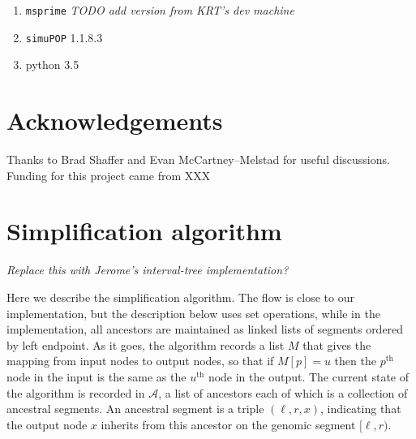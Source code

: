 \documentclass{article}
\newcommand{\simupop}{\texttt{simuPOP}}
\newcommand{\msprime}{\texttt{msprime}}
\newcommand{\Al}{\mathcal{A}}  %
\newcommand{\plr}[1]{{\em \color{blue} #1}}
\newcommand{\jda}[1]{{\em \color{cyan} #1}}
\begin{document}
\begin{enumerate}
    \item \msprime{} \jda{TODO add version from KRT's dev machine}
    \item \simupop{} 1.1.8.3
    \item python 3.5
\end{enumerate}

\section*{Acknowledgements}
Thanks to Brad Shaffer and Evan McCartney--Melstad for useful discussions.
Funding for this project came from XXX




\appendix

\section{Simplification algorithm}
\label{ss:simplify_algorithm}

\plr{Replace this with Jerome's interval-tree implementation?}

Here we describe the simplification algorithm.
The flow is close to our implementation,
but the description below uses set operations,
while in the implementation,
all ancestors are maintained as linked lists of segments
ordered by left endpoint.
As it goes, the algorithm
records a list $M$ that gives the mapping
from input nodes to output nodes,
so that if $M[p] = u$ then the $p^\text{th}$ node in the input
is the same as the $u^\text{th}$ node in the output.
The current state of the algorithm is recorded in $\Al$,
a list of ancestors
each of which is a collection of ancestral segments.
An ancestral segment is a triple $(\ell, r, x)$,
indicating that the output node $x$ inherits from this ancestor
on the genomic segment $[\ell, r)$.
\end{document}
